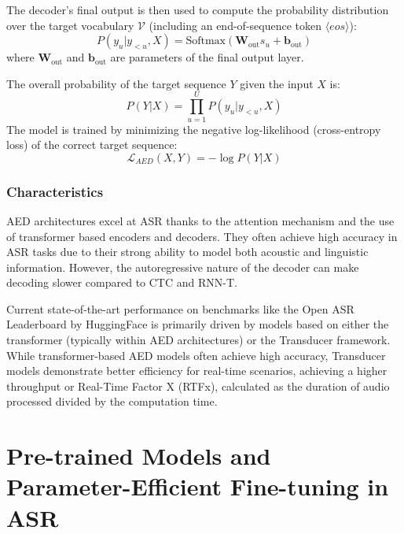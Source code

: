 The decoder's final output is then used to compute the probability distribution over the target vocabulary $\mathcal{V}$ (including an end-of-sequence token $\langle eos \rangle$):
\begin{equation}
    P(y_u | y_{<u}, X) = \text{Softmax}(\mathbf{W}_{\text{out}} s_u + \mathbf{b}_{\text{out}})
\end{equation}
where $\mathbf{W}_{\text{out}}$ and $\mathbf{b}_{\text{out}}$ are parameters of the final output layer.

The overall probability of the target sequence $Y$ given the input $X$ is:
\begin{equation} \label{eq:aed_prob}
    P(Y|X) = \prod_{u=1}^{U} P(y_u | y_{<u}, X)
\end{equation}
The model is trained by minimizing the negative log-likelihood (cross-entropy loss) of the correct target sequence:
\begin{equation} \label{eq:aed_loss}
    \mathcal{L}_{AED}(X, Y) = -\log P(Y|X)
\end{equation}


\subsection{Characteristics}

AED architectures excel at ASR thanks to the attention mechanism and the use of transformer based encoders and decoders. They often achieve high accuracy in ASR tasks due to their strong ability to model both acoustic and linguistic information. However, the autoregressive nature of the decoder can make decoding slower compared to CTC and RNN-T.
\newline

Current state-of-the-art performance on benchmarks like the Open ASR Leaderboard \cite{open-asr-leaderboard} by HuggingFace is primarily driven by models based on either the transformer (typically within AED architectures) or the Transducer framework. While transformer-based AED models often achieve high accuracy, Transducer models demonstrate better efficiency for real-time scenarios, achieving a higher throughput or Real-Time Factor X (RTFx), calculated as the duration of audio processed divided by the computation time.


\chapter{Pre-trained Models and Parameter-Efficient Fine-tuning in ASR}\label{pretrain-models-peft}

